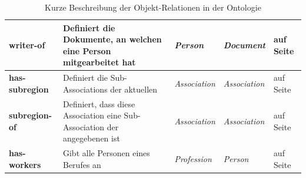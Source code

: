 \documentclass[draft,
    11pt,
    latin1,
    a4paper,
    oneside
]{scrreprt}
\let\oldemph=\emph
\renewcommand{\emph}[1]{\index{#1}\oldemph{#1}}
\begin{document}
\begin{table}[H]
\begin{tabular}{ | l | p{4cm} | p{3cm} | p{2cm} | p{2cm} | }
    \textbf{writer-of} & Definiert die Dokumente, an welchen eine Person mitgearbeitet hat & \emph{Person} & \emph{Document} & \nameref{sec:rel_writerof} auf Seite \pageref{sec:rel_writerof} \\ \hline
    \textbf{has-subregion} & Definiert die Sub-Associations der aktuellen & \emph{Association} & \emph{Association} & \nameref{sec:rel_hassubregion} auf Seite \pageref{sec:rel_hassubregion} \\ \hline
    \textbf{subregion-of} & Definiert, dass diese Association eine Sub-Association der angegebenen ist & \emph{Association} & \emph{Association} & \nameref{sec:rel_subregionof} auf Seite \pageref{sec:rel_subregionof} \\ \hline
    \textbf{has-workers} & Gibt alle Personen eines Berufes an & \emph{Profession} & \emph{Person} & \nameref{sec:rel_hasworkers} auf Seite \pageref{sec:rel_hasworkers} \\ \hline
  \end{tabular}
  \caption{Kurze Beschreibung der Objekt-Relationen in der Ontologie}
  \label{tbl:relations}
\end{table}
\end{document}

